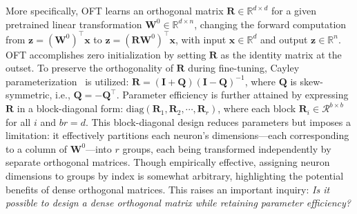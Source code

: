 More specifically, OFT learns an orthogonal matrix $\bm{R}\in\mathbb{R}^{d\times d}$ for a given pretrained linear transformation $\bm{W}^0\in\mathbb{R}^{d\times n}$, changing the forward computation from $\bm{z}=(\bm{W}^0)^\top\bm{x}$ to $\bm{z}=(\bm{R}\bm{W}^0)^\top\bm{x}$, with input $\bm{x}\in\mathbb{R}^{d}$ and output $\bm{z}\in\mathbb{R}^{n}$. OFT accomplishes zero initialization by setting $\bm{R}$ as the identity matrix at the outset. To preserve the orthogonality of $\bm{R}$ during fine-tuning, Cayley parameterization~\cite{qiu2023controlling,liu2021orthogonal} is utilized: $\bm{R}=(\bm{I}+\bm{Q})(\bm{I}-\bm{Q})^{-1}$, where $\bm{Q}$ is skew-symmetric, i.e., $\bm{Q}=-\bm{Q}^\top$. Parameter efficiency is further attained by expressing $\bm{R}$ in a block-diagonal form: $\text{diag}(\bm{R}_1,\bm{R}_2,\cdots,\bm{R}_r)$, where each block $\bm{R}_i\in\mathcal{R}^{b\times b}$ for all $i$ and $br=d$. This block-diagonal design reduces parameters but imposes a limitation: it effectively partitions each neuron's dimensions—each corresponding to a column of $\bm{W}^0$—into $r$ groups, each being transformed independently by separate orthogonal matrices. Though empirically effective, assigning neuron dimensions to groups by index is somewhat arbitrary, highlighting the potential benefits of dense orthogonal matrices. This raises an important inquiry: \emph{Is it possible to design a dense orthogonal matrix while retaining parameter efficiency?}

